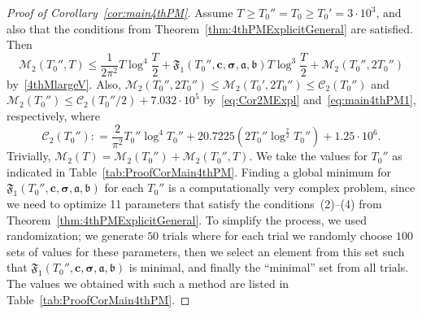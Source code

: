 \documentclass[a4paper,reqno]{amsart}
\theoremstyle{definition}
\newcommand{\de}[0]{\mathrel{\mathop:}=}
\begin{document}
\begin{proof}[Proof of Corollary~\ref{cor:main4thPM}]
Assume $T\geq T_0''=T_0\geq T_0'=3\cdot 10^3$, and also that the conditions from Theorem~\ref{thm:4thPMExplicitGeneral} are satisfied. Then 
\begin{equation}
\label{eq:Cor2M2}
\mathcal{M}_{2}\left(T_0'',T\right) \leq \frac{1}{2\pi^2}T\log^{4}{\frac{T}{2}} + \mathfrak{F}_{1}\left(T_0'',\bm{c},\bm{\sigma},\bm{\mathfrak{a}},\bm{\mathfrak{b}}\right)T\log^{3}{\frac{T}{2}} + \mathcal{M}_{2}\left( T_{0}'',2T_{0}''\right)
\end{equation}
by~\eqref{4thMlargeV}. Also, $\mathcal{M}_{2}\left(T_0'',2T_0''\right)\leq \mathcal{M}_{2}\left(T_0',2T_0''\right)\leq\mathcal{C}_{2}\left( T_{0}''\right)$ and $\mathcal{M}_{2}\left(T_0''\right)\leq\mathcal{C}_{2}\left( T_{0}''/2\right)+7.032\cdot10^5$ by~\eqref{eq:Cor2MExpl} and~\eqref{eq:main4thPM1}, respectively, where
\[
\mathcal{C}_{2}\left( T_{0}''\right)\de \frac{2}{\pi^2}T_0''\log^{4}{T_0''} + 20.7225\left(2T_0''\log^{\frac{7}{2}}{T_0''} \right)+ 1.25\cdot 10^6.
\] 
Trivially, $\mathcal{M}_{2}(T)=\mathcal{M}_{2}\left(T_0''\right)+\mathcal{M}_{2}\left(T_0'',T\right)$. We take the values for $T_0''$ as indicated in Table~\ref{tab:ProofCorMain4thPM}. Finding a global minimum for $\mathfrak{F}_1\left(T_0'',\bm{c},\bm{\sigma},\bm{\mathfrak{a}},\bm{\mathfrak{b}}\right)$ for each $T_0''$ is a computationally very complex problem, since we need to optimize 11 parameters that satisfy the conditions~(2)--(4) from Theorem~\ref{thm:4thPMExplicitGeneral}. To simplify the process, we used randomization; we generate $50$ trials where for each trial we randomly choose $100$ sets of values for these parameters, then we select an element from this set such that $\mathfrak{F}_1\left(T_0'',\bm{c},\bm{\sigma},\bm{\mathfrak{a}},\bm{\mathfrak{b}}\right)$ is minimal, and finally the ``minimal'' set from all trials. The values we obtained with such a method are listed in Table~\ref{tab:ProofCorMain4thPM}.


\end{proof}
\end{document}
